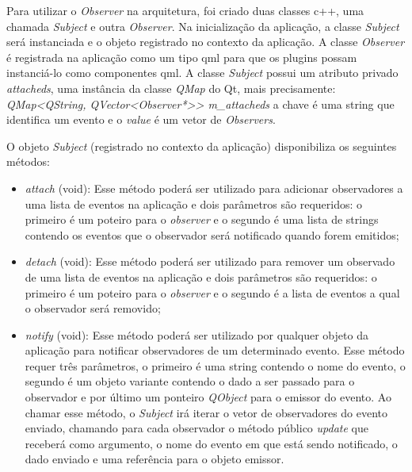 Para utilizar o \textit{Observer} na arquitetura, foi criado duas classes c++, uma chamada \textit{Subject} e outra \textit{Observer}. Na inicialização da aplicação, a classe \textit{Subject} será instanciada e o objeto registrado no contexto da aplicação. A classe \textit{Observer} é registrada na aplicação como um tipo qml para que os plugins possam instanciá-lo como componentes qml. A classe \textit{Subject} possui um atributo privado \textit{attacheds}, uma instância da classe \textit{QMap} do Qt, mais precisamente: \textit{QMap<QString, QVector<Observer*>> m\_attacheds} a chave é uma string que identifica um evento e o \textit{value} é um vetor de \textit{Observers}.

O objeto \textit{Subject} (registrado no contexto da aplicação) disponibiliza os seguintes métodos:

\begin{itemize}
	\item \textit{attach} (void): Esse método poderá ser utilizado para adicionar observadores a uma lista de eventos na aplicação e dois parâmetros são requeridos: o primeiro é um poteiro para o \textit{observer} e o segundo é uma lista de strings contendo os eventos que o observador será notificado quando forem emitidos;
	\item \textit{detach} (void): Esse método poderá ser utilizado para remover um observado de uma lista de eventos na aplicação e dois parâmetros são requeridos: o primeiro é um poteiro para o \textit{observer} e o segundo é a lista de eventos a qual o observador será removido;
	\item \textit{notify} (void): Esse método poderá ser utilizado por qualquer objeto da aplicação para notificar observadores de um determinado evento. Esse método requer três parâmetros, o primeiro é uma string contendo o nome do evento, o segundo é um objeto variante contendo o dado a ser passado para o observador e por último um ponteiro \textit{QObject} para o emissor do evento. Ao chamar esse método, o \textit{Subject} irá iterar o vetor de observadores do evento enviado, chamando para cada observador o método público \textit{update} que receberá como argumento, o nome do evento em que está sendo notificado, o dado enviado e uma referência para o objeto emissor.
\end{itemize}


